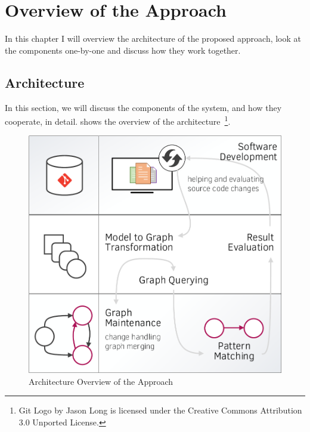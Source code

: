 \chapter{Overview of the Approach}
\label{chap:overview-of-the-approach}

In this chapter I will overview the architecture of the proposed approach, look at the components one-by-one and discuss how they work together.

\section{Architecture}
\label{sect:architecture}

In this section, we will discuss the components of the system, and how they cooperate,
in detail.  shows the overview of the architecture~\footnote{Git Logo by Jason Long is licensed under the Creative Commons Attribution 3.0 Unported License.}.

\begin{figure}[!htb]
  \centering
  \includegraphics[width=\textwidth]{include/figures/architecture.pdf}
  \caption{Architecture Overview of the Approach}
  \label{fig:architecture-overview}
\end{figure}
